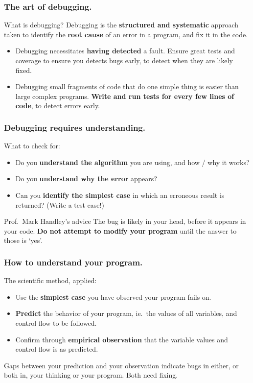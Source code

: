 \documentclass{beamer} %
\newcommand\emc[1]{\textcolor{brightblue}{\textbf{#1}}}
\begin{document}
\begin{frame}
\frametitle{The art of debugging.}

\begin{block}{What is debugging?}
Debugging is the \emc{structured and systematic} approach taken to identify the \emc{root cause} of an error in a program, and fix it in the code.
\end{block}

\begin{itemize}
	\item Debugging necessitates \emc{having detected} a fault. Ensure great tests and coverage to ensure you detects bugs early, to detect when they are likely fixed.
	\item Debugging small fragments of code that do one simple thing is easier than large complex programs. \emc{Write and run tests for every few lines of code}, to detect errors early.
\end{itemize}

\end{frame}

\begin{frame}
\frametitle{Debugging requires understanding.}

What to check for:
\begin{itemize}
	\item Do you \emc{understand the algorithm} you are using, and how / why it works?
	\item Do you \emc{understand why the error} appears?
	\item Can you \emc{identify the simplest case} in which an erroneous result is returned? (Write a test case!)
\end{itemize}

\begin{block}{Prof.\ Mark Handley's advice}
The bug is likely in your head, before it appears in your code. \emc{Do not attempt to modify your program} until the answer to those is `yes'.
\end{block}

\end{frame}

\begin{frame}
\frametitle{How to understand your program.}

The scientific method, applied:
\begin{itemize}
	\item Use the \emc{simplest case} you have observed your program fails on.
	\item \emc{Predict} the behavior of your program, ie.\ the values of all variables, and control flow to be followed.
	\item Confirm through \emc{empirical observation} that the variable values and control flow is as predicted.
\end{itemize}

\vspace{3mm}
Gaps between your prediction and your observation indicate bugs in either, or both in, your thinking or your program. Both need fixing.

\end{frame}
\end{document}
